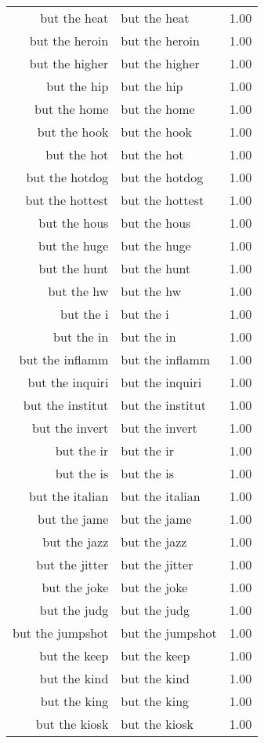 \begin{table}[ht]
\begin{tabular}{rlr}
  but the heat & but the heat & 1.00 \\ 
  but the heroin & but the heroin & 1.00 \\ 
  but the higher & but the higher & 1.00 \\ 
  but the hip & but the hip & 1.00 \\ 
  but the home & but the home & 1.00 \\ 
  but the hook & but the hook & 1.00 \\ 
  but the hot & but the hot & 1.00 \\ 
  but the hotdog & but the hotdog & 1.00 \\ 
  but the hottest & but the hottest & 1.00 \\ 
  but the hous & but the hous & 1.00 \\ 
  but the huge & but the huge & 1.00 \\ 
  but the hunt & but the hunt & 1.00 \\ 
  but the hw & but the hw & 1.00 \\ 
  but the i & but the i & 1.00 \\ 
  but the in & but the in & 1.00 \\ 
  but the inflamm & but the inflamm & 1.00 \\ 
  but the inquiri & but the inquiri & 1.00 \\ 
  but the institut & but the institut & 1.00 \\ 
  but the invert & but the invert & 1.00 \\ 
  but the ir & but the ir & 1.00 \\ 
  but the is & but the is & 1.00 \\ 
  but the italian & but the italian & 1.00 \\ 
  but the jame & but the jame & 1.00 \\ 
  but the jazz & but the jazz & 1.00 \\ 
  but the jitter & but the jitter & 1.00 \\ 
  but the joke & but the joke & 1.00 \\ 
  but the judg & but the judg & 1.00 \\ 
  but the jumpshot & but the jumpshot & 1.00 \\ 
  but the keep & but the keep & 1.00 \\ 
  but the kind & but the kind & 1.00 \\ 
  but the king & but the king & 1.00 \\ 
  but the kiosk & but the kiosk & 1.00 \\ 

\end{tabular}
\end{table}
